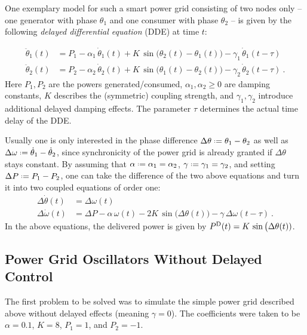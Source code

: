 \documentclass{scrartcl}
\newcommand*{\defeq}{\mathrel{\vcenter{\baselineskip0.5ex \lineskiplimit0pt
                     \hbox{\scriptsize.}\hbox{\scriptsize.}}}%
                     =}
\begin{document}
One exemplary model for such a smart power grid consisting of two nodes
only -- one generator with phase $\theta_1$ and one consumer with phase
$\theta_2$ -- is given by the following  \emph{delayed differential
equation} (DDE) at time $t$:

\begin{equation}
\begin{aligned}
    \ddot{\theta}_1(t) &= P_1 - \alpha_1\,\dot{\theta}_1(t) + 
                         K\,\sin\big(\theta_2(t) - \theta_1(t)\big) - 
                         \gamma_1\,\dot{\theta}_1(t - \tau)\\
    \ddot{\theta}_2(t) &= P_2 - \alpha_2\,\dot{\theta}_2(t) + 
                         K\,\sin\big(\theta_1(t) - \theta_2(t)\big) - 
                         \gamma_2\,\dot{\theta}_2(t - \tau)~.
\end{aligned}
\end{equation}
Here $P_1, P_2$ are the powers generated/consumed, $\alpha_1, \alpha_2\ge 0$ are
damping constants, $K$ describes the (symmetric) coupling strength, and
$\gamma_1, \gamma_2$ introduce additional delayed damping effects. The
parameter $\tau$ determines the actual time delay of the DDE.

Usually one is only interested in the phase difference $\Delta\theta
\defeq \theta_1 - \theta_2$ as well as $\Delta\omega\defeq \dot{\theta}_1
- \dot{\theta}_2$, since synchronicity of the power grid is already granted
if $\Delta\theta$ stays constant. By assuming that $\alpha \defeq \alpha_1
= \alpha_2$, $\gamma \defeq \gamma_1 = \gamma_2$, and setting $\Delta
P \defeq P_1 - P_2$, one can take the difference of the two above equations and
turn it into two coupled equations of order one:
\begin{equation}\label{eq:smart_grid}
\begin{aligned}
    \Delta\dot{\theta}(t) &= \Delta\omega(t) \\
    \Delta\dot{\omega}(t) &= \Delta P - \alpha\,\omega(t)
    - 2K\,\sin\big(\Delta\theta(t)\big) - \gamma\,\Delta\omega(t-\tau)~.
\end{aligned}
\end{equation}
In the above equations, the delivered power is given by $P^{\mathrm{D}}(t)
= K\,\sin\big(\Delta\theta(t))$.

\subsection{Power Grid Oscillators Without Delayed Control}
The first problem to be solved was to simulate the simple power grid
described above without delayed effects (meaning $\gamma = 0$). The
coefficients were taken to be $\alpha = 0.1$, $K = 8$, $P_1 = 1$, and $P_2
= -1$. 
\end{document}

